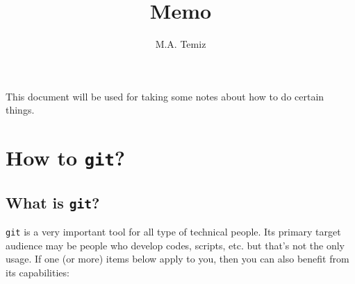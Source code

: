 \documentclass{article}
\title{Memo}
\author{M.A. Temiz}
\begin{document}
\maketitle
This document will be used for taking some notes about how to do certain things.
\section{How to \texttt{git}?}
    \subsection{What is \texttt{git}?}
        \texttt{git} is a very important tool for all type of technical people. Its primary target audience may be people who develop codes, scripts, etc. but that's not the only usage. If one (or more) items below apply to you, then you can also benefit from its capabilities:
\end{document}
